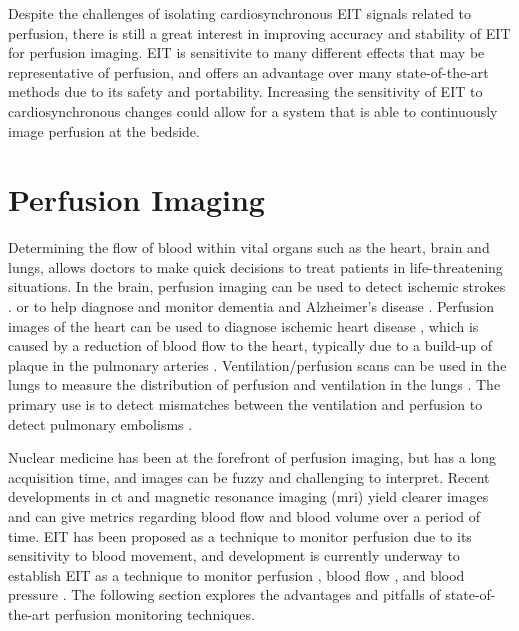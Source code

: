 Despite the challenges of isolating cardiosynchronous EIT signals related to 
perfusion, there is still a great interest in 
improving accuracy and stability of EIT for perfusion imaging.
EIT is sensitivite to many different effects that may be representative of 
perfusion, and offers an advantage over many  
state-of-the-art methods due to its safety and portability. 
Increasing the sensitivity of EIT to cardiosynchronous changes could
allow for a system that is able to 
continuously image perfusion at the bedside.

\section{Perfusion Imaging}

Determining the flow of blood within vital organs such as the heart, brain and lungs, 
allows doctors to make quick decisions to treat patients in life-threatening situations.
In the brain, perfusion imaging can be used to 
detect ischemic strokes 
\parencite{koenig_perfusion_1998,konstas_theoretic_2009}. 
or to help 
diagnose and monitor dementia
and Alzheimer's disease \parencite{dougall_systematic_2004,barker_pathophysiology_2014}.
Perfusion images of the heart can be used to diagnose ischemic 
heart disease \parencite{prvulovich_role_1998}, which is caused by a reduction 
of blood flow to the heart, typically due to 
a build-up of plaque in the pulmonary arteries
\parencite{mendis_global_2011}. Ventilation/perfusion scans can be used in the 
lungs to measure the distribution of perfusion and ventilation in the lungs 
\parencite{mortensen_lung_2019}. The primary use 
is to detect mismatches between the ventilation and perfusion to detect pulmonary 
embolisms \parencite{pioped-investigators_value_1990}.   

Nuclear medicine has been at the forefront of perfusion imaging, but has a long
acquisition time, and images can be fuzzy and 
challenging to interpret. 
Recent developments in \acrfull{ct} and magnetic resonance imaging (\acrshort{mri})
yield clearer images and can give metrics 
regarding blood flow and blood volume over a period of 
time. 
EIT has been proposed as a technique to monitor perfusion due 
to its sensitivity to blood movement, 
and development is currently underway to 
establish EIT as a technique to monitor 
perfusion \parencite{nguyen_review_2012,nguyen_perfusion_2015}, 
blood flow \parencite{braun_limitations_2018,braun_accuracy_2018}, and 
blood pressure \parencite{proenca_noninvasive_2017,proenca_non-invasive_2020}. 
The following section 
explores the advantages and pitfalls of state-of-the-art perfusion monitoring techniques. 


